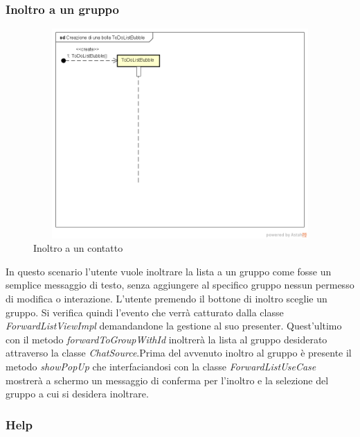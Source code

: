 \subsubsection{Inoltro a un gruppo}

\label{Inoltro a un contatto}
\begin{figure}[H]
	\centering
	\includegraphics[width=12cm, height=8cm]{Sezioni/Diagrammi/img/Creazione di una bolla ToDoListBubble.png}
	\caption{Inoltro a un contatto}
	
\end{figure}

In questo scenario l'utente vuole inoltrare la lista a un gruppo come fosse un semplice messaggio di testo, senza aggiungere al specifico gruppo nessun permesso di modifica o interazione. L'utente premendo il bottone di inoltro sceglie un gruppo. Si verifica quindi l'evento che verrà catturato dalla classe \textit{ForwardListViewImpl} demandandone la gestione al suo presenter.
Quest'ultimo con il metodo \textit{forwardToGroupWithId} inoltrerà la lista al gruppo desiderato attraverso la classe \textit{ChatSource}.Prima del avvenuto inoltro al gruppo è presente il metodo \textit{showPopUp} che interfaciandosi con la classe \textit{ForwardListUseCase} mostrerà a schermo un messaggio di conferma per l'inoltro e la selezione del gruppo a cui si desidera inoltrare.


\subsubsection{Help}

